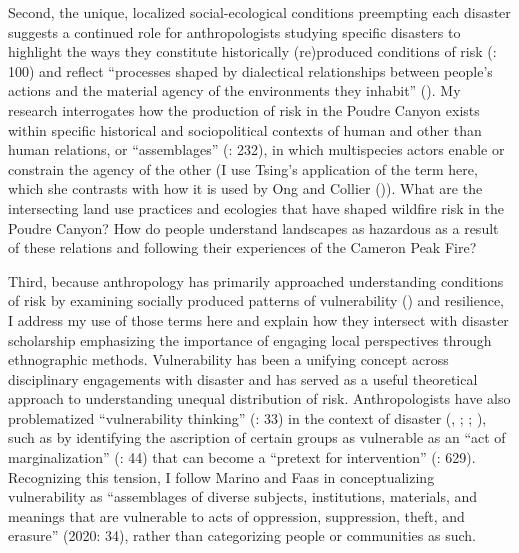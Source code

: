 \documentclass[
]{article}
\begin{document}
Second, the unique, localized social-ecological conditions preempting each disaster suggests a continued role for anthropologists studying specific disasters to highlight the ways they constitute historically (re)produced conditions of risk (: 100) and reflect ``processes shaped by dialectical relationships between people's actions and the material agency of the environments they inhabit'' (). My research interrogates how the production of risk in the Poudre Canyon exists within specific historical and sociopolitical contexts of human and other than human relations, or ``assemblages'' (: 232), in which multispecies actors enable or constrain the agency of the other (I use Tsing's application of the term here, which she contrasts with how it is used by Ong and Collier ()). What are the intersecting land use practices and ecologies that have shaped wildfire risk in the Poudre Canyon? How do people understand landscapes as hazardous as a result of these relations and following their experiences of the Cameron Peak Fire?

Third, because anthropology has primarily approached understanding conditions of risk by examining socially produced patterns of vulnerability () and resilience, I address my use of those terms here and explain how they intersect with disaster scholarship emphasizing the importance of engaging local perspectives through ethnographic methods. Vulnerability has been a unifying concept across disciplinary engagements with disaster and has served as a useful theoretical approach to understanding unequal distribution of risk. Anthropologists have also problematized ``vulnerability thinking'' (: 33) in the context of disaster (, ; ; ), such as by identifying the ascription of certain groups as vulnerable as an ``act of marginalization'' (: 44) that can become a ``pretext for intervention'' (: 629). Recognizing this tension, I follow Marino and Faas in conceptualizing vulnerability as ``assemblages of diverse subjects, institutions, materials, and meanings that are vulnerable to acts of oppression, suppression, theft, and erasure'' (2020: 34), rather than categorizing people or communities as such.
\end{document}
